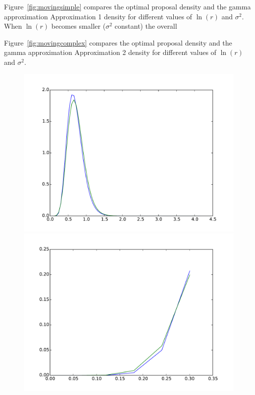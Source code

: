 \documentclass{article}
\begin{document}
Figure~\ref{fig:movingsimple} compares the optimal proposal density and the gamma approximation Approximation 1 density for different values of $\ln(r)$ and $\sigma^2$. When $\ln(r)$ becomes smaller ($\sigma^2$ constant) the overall

Figure~\ref{fig:movingcomplex} compares the optimal proposal density and the gamma approximation Approximation 2 density for different values of $\ln(r)$ and $\sigma^2$.



\begin{figure}[htb]
	\centering
	\begin{minipage}{.45\textwidth}
		\centering
		\includegraphics[width=0.97\linewidth]{bootstrap-filter/global_simple_3_3.pdf}
	\end{minipage}
	\begin{minipage}{.45\textwidth}
		\centering
		\includegraphics[width=0.97\linewidth]{bootstrap-filter/beginning_simple_3_3.pdf}

\end{minipage}
\end{figure}
\end{document}
